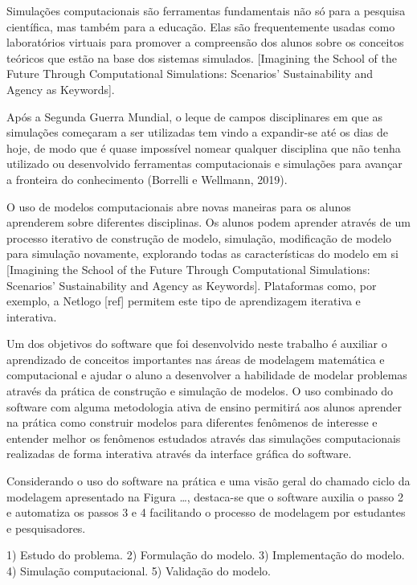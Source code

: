 \documentclass[
	12pt,				%
	openright,			%
	oneside,			%
	a4paper,			%
	main=brazil,
	english,			%
	]{ufsj-abntex2}
\begin{document}
Simulações computacionais são ferramentas fundamentais não só para a pesquisa científica, mas também para a educação. Elas são frequentemente usadas como laboratórios virtuais para promover a compreensão dos alunos sobre os conceitos teóricos que estão na base dos sistemas simulados. [Imagining the School of the Future Through Computational Simulations: Scenarios’ Sustainability and Agency as Keywords]. 

Após a Segunda Guerra Mundial, o leque de campos disciplinares em que as simulações começaram a ser utilizadas tem vindo a expandir-se até os dias de hoje, de modo que é quase impossível nomear qualquer disciplina que não tenha utilizado ou desenvolvido ferramentas computacionais e simulações para avançar a fronteira do conhecimento (Borrelli e Wellmann, 2019).

O uso de modelos computacionais abre novas maneiras para os alunos aprenderem sobre diferentes disciplinas. Os alunos podem aprender através de um processo iterativo de construção de modelo, simulação, modificação de modelo para simulação novamente, explorando todas as características do modelo em si [Imagining the School of the Future Through Computational Simulations: Scenarios’ Sustainability and Agency as Keywords]. Plataformas como, por exemplo, a Netlogo [ref] permitem este tipo de aprendizagem iterativa e interativa.

Um dos objetivos do software que foi desenvolvido neste trabalho é auxiliar o aprendizado de conceitos importantes nas áreas de modelagem matemática e computacional e ajudar o aluno a desenvolver a habilidade de modelar problemas através da prática de construção e simulação de modelos. O uso combinado do software com alguma metodologia ativa de ensino permitirá aos alunos aprender na prática como construir modelos para diferentes fenômenos de interesse e entender melhor os fenômenos estudados através das simulações computacionais realizadas de forma interativa através da interface gráfica do software. 

Considerando o uso do software na prática e uma visão geral do chamado ciclo da modelagem apresentado na Figura …, destaca-se que o software auxilia o passo 2 e automatiza os passos 3 e 4 facilitando o processo de modelagem por estudantes e pesquisadores. 


1) Estudo do problema.
2) Formulação do modelo.
3) Implementação do modelo.
4) Simulação computacional.
5) Validação do modelo.
\end{document}
